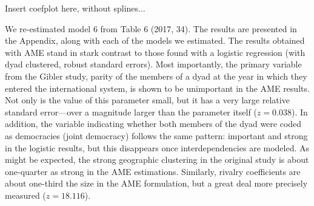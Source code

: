 Insert coefplot here, without splines...\label{fig:giberrepl}
%

We re-estimated model 6 from Table 6 (2017, 34). The results are presented in the Appendix, along with each of the models we estimated.
The results obtained with AME stand in stark contrast to those found with a logistic regression (with dyad clustered, robust standard errors).  Most importantly, the primary variable from the Gibler study, parity of the members of a dyad at the year in which they entered the international system, is shown to be unimportant in the AME results.  Not only is the value of this parameter small, but it has a very large relative standard error---over a magnitude larger than the parameter itself ($z= 0.038$). In addition, the variable indicating whether both members of the dyad were coded as democracies (joint democracy) follows the same pattern: important and strong in the logistic results, but this disappears once interdependencies are modeled.  As might be expected, the strong geographic clustering in the original study is about one-quarter as strong in the AME estimations. Similarly, rivalry coefficients are about one-third the size in the AME formulation, but a great deal more precisely measured ($z=18.116$). 

